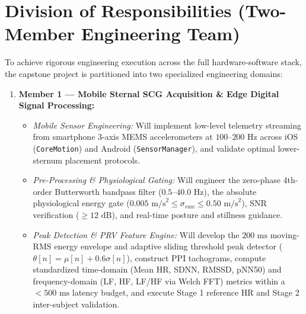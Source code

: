 \section{Division of Responsibilities (Two-Member Engineering Team)}
To achieve rigorous engineering execution across the full hardware-software stack, the capstone project is partitioned into two specialized engineering domains:

\begin{enumerate}
	\item \textbf{Member 1 --- Mobile Sternal SCG Acquisition \& Edge Digital Signal Processing:}
	\begin{itemize}
		\item \textit{Mobile Sensor Engineering:} Will implement low-level telemetry streaming from smartphone 3-axis MEMS accelerometers at $100\text{--}200\text{ Hz}$ across iOS (\texttt{CoreMotion}) and Android (\texttt{SensorManager}), and validate optimal lower-sternum placement protocols.
		\item \textit{Pre-Processing \& Physiological Gating:} Will engineer the zero-phase 4th-order Butterworth bandpass filter ($0.5\text{--}40.0\text{ Hz}$), the absolute physiological energy gate ($0.005\text{ m/s}^2 \le \sigma_{raw} \le 0.50\text{ m/s}^2$), SNR verification ($\ge 12\text{ dB}$), and real-time posture and stillness guidance.
		\item \textit{Peak Detection \& PRV Feature Engine:} Will develop the $200\text{ ms}$ moving-RMS energy envelope and adaptive sliding threshold peak detector ($\theta[n] = \mu[n] + 0.6\sigma[n]$), construct PPI tachograms, compute standardized time-domain (Mean HR, SDNN, RMSSD, pNN50) and frequency-domain (LF, HF, LF/HF via Welch FFT) metrics within a $<500\text{ ms}$ latency budget, and execute Stage 1 reference HR and Stage 2 inter-subject validation.
	\end{itemize}


\end{enumerate}
